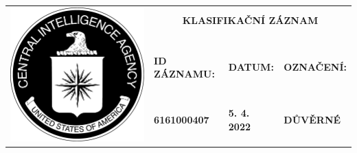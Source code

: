 \documentclass[a4paper, 11pt]{article}
\newcommand{\blackcell}{\cellcolor{black} \color{white} \ttfamily \bfseries}
\begin{document}
	\noindent
	\begin{table}[H]
		\renewcommand\tabularxcolumn[1]{m{#1}}
		\def\arraystretch{1.5}
		\begin{tabularx}{\textwidth}{l X X X}
			\multirow{4}{*}{ \includegraphics[scale=0.22]{sources/CIA_logo.pdf} } & \multicolumn{3}{c}{\bfseries \ttfamily \Huge KLASIFIKAČNÍ ZÁZNAM} \\
			&&&\\
			& \blackcell ID ZÁZNAMU: & \blackcell DATUM: & \blackcell OZNAČENÍ: \\
			& \blackcell 6161000407 & \blackcell 5. 4. 2022 & \blackcell DŮVĚRNÉ \\
			
		\end{tabularx}
	\end{table}
	
\end{document}
